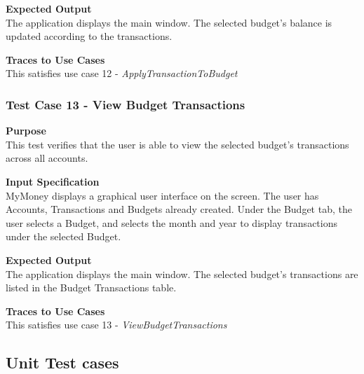 \documentclass[12pt]{article}
\begin{document}
\noindent
{\bf Expected Output}\\
The application displays the main window. The selected budget's balance is updated according to the transactions.

\noindent
{\bf Traces to Use Cases}\\
This satisfies use case 12 - \textit{ApplyTransactionToBudget}
\clearpage %

\subsubsection{Test Case 13 - View Budget Transactions} \label{TC-13}
\noindent
{\bf Purpose}\\
This test verifies that the user is able to view the selected budget's transactions across all accounts.                    
                            
\noindent
{\bf Input Specification}\\
MyMoney displays a graphical user interface on the screen. The user has Accounts, Transactions and Budgets already created. Under the Budget tab, the user selects a Budget, and selects the month and year to display transactions under the selected Budget.

\noindent
{\bf Expected Output}\\
The application displays the main window. The selected budget's transactions are listed in the Budget Transactions table.

\noindent
{\bf Traces to Use Cases}\\
This satisfies use case 13 - \textit{ViewBudgetTransactions}
\clearpage

\subsection{Unit Test cases}

\end{document}
